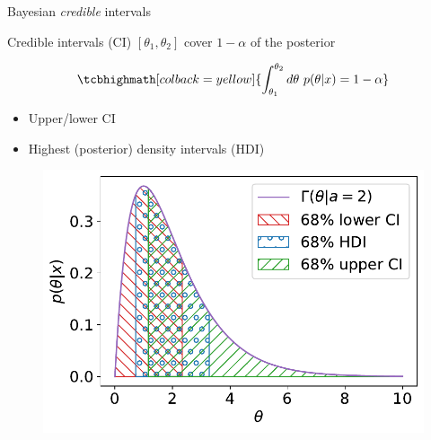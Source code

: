 \documentclass[
aspectratio=169,
14pt,
professionalfonts
]{beamer}
\begin{document}
\begin{frame}{Bayesian \textit{credible} intervals}

Credible intervals (CI) $[\theta_1, \theta_2]$ cover $1-\alpha$ of the posterior
\begin{minipage}{0.49\linewidth}
    $$
    \tcbhighmath[colback=yellow]{
    \int_{\theta_1}^{\theta_2} d\theta ~ p(\theta| x) = 1-\alpha
    }
    $$
    \begin{itemize}
        \item Upper/lower CI
        \item Highest (posterior) density intervals (HDI)
    \end{itemize}
\end{minipage}
\begin{minipage}{0.49\linewidth}
    \begin{figure}
        \centering
        \includegraphics[width=\linewidth]{../plots/intervals.pdf}
    \end{figure}
\end{minipage}

\end{frame}
\end{document}
